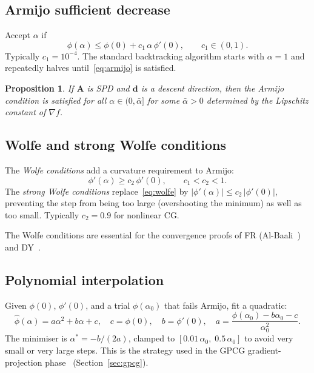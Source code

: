 \documentclass[11pt,a4paper]{article}
\newtheorem{proposition}[theorem]{Proposition}
\newcommand{\bA}{\mathbf{A}}
\newcommand{\bd}{\mathbf{d}}
\begin{document}
\subsection{Armijo sufficient decrease}

Accept $\alpha$ if
\begin{equation}
  \phi(\alpha) \leq \phi(0) + c_1\,\alpha\,\phi'(0), \qquad c_1 \in (0,1).
  \label{eq:armijo}
\end{equation}
Typically $c_1 = 10^{-4}$.  The standard backtracking algorithm starts with
$\alpha = 1$ and repeatedly halves until~\eqref{eq:armijo} is satisfied.

\begin{proposition}
  If $\bA$ is SPD and $\bd$ is a descent direction, then the Armijo condition
  is satisfied for all $\alpha \in (0, \bar\alpha]$ for some $\bar\alpha > 0$
  determined by the Lipschitz constant of $\nabla f$.
\end{proposition}

\subsection{Wolfe and strong Wolfe conditions}

The \emph{Wolfe conditions} add a curvature requirement to Armijo:
\begin{equation}
  \phi'(\alpha) \geq c_2\,\phi'(0), \qquad c_1 < c_2 < 1.
  \label{eq:wolfe}
\end{equation}
The \emph{strong Wolfe conditions} replace~\eqref{eq:wolfe} by
$|\phi'(\alpha)| \leq c_2\,|\phi'(0)|$, preventing the step from being too
large (overshooting the minimum) as well as too small.  Typically $c_2 = 0.9$
for nonlinear CG.

The Wolfe conditions are essential for the convergence proofs of FR
(Al-Baali~\cite{AlBaali1985}) and DY~\cite{DaiYuan1999}.

\subsection{Polynomial interpolation}

Given $\phi(0)$, $\phi'(0)$, and a trial $\phi(\alpha_0)$ that fails
Armijo, fit a quadratic:
\[
  \hat\phi(\alpha) = a\alpha^2 + b\alpha + c, \quad
  c = \phi(0),\quad b = \phi'(0),\quad
  a = \frac{\phi(\alpha_0) - b\alpha_0 - c}{\alpha_0^2}.
\]
The minimiser is $\alpha^* = -b/(2a)$, clamped to $[0.01\,\alpha_0,\; 0.5\,\alpha_0]$
to avoid very small or very large steps.  This is the strategy used in the
GPCG gradient-projection phase~\cite{MoreToraldo1991} (Section~\ref{sec:gpcg}).
\end{document}
